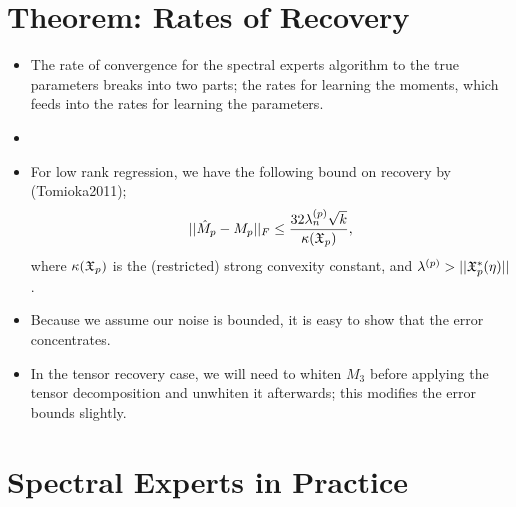 \documentclass[tablecaption=bottom]{jmlr}
\begin{document}
\section{Theorem: Rates of Recovery}

\begin{itemize}
\item
  The rate of convergence for the spectral experts algorithm to the true
  parameters breaks into two parts; the rates for learning the moments,
  which feeds into the rates for learning the parameters.
\item
\item
  For low rank regression, we have the following bound on recovery by
  (Tomioka2011);
  \[ || \hat M_p - M_p ||_F \le \frac{32 \lambda^{(p)}_n \sqrt{k}}{\kappa(\mathfrak{X}_p)}, \]
  where $\kappa(\mathfrak{X}_p)$ is the (restricted) strong convexity constant,
  and $\lambda^{(p)} > ||\mathfrak{X}^*_p(\eta)||$.
\item
  Because we assume our noise is bounded, it is easy to show that the
  error concentrates.
\item
  In the tensor recovery case, we will need to whiten $M_3$ before
  applying the tensor decomposition and unwhiten it afterwards; this
  modifies the error bounds slightly.
\end{itemize}
\section{Spectral Experts in Practice}
\end{document}
